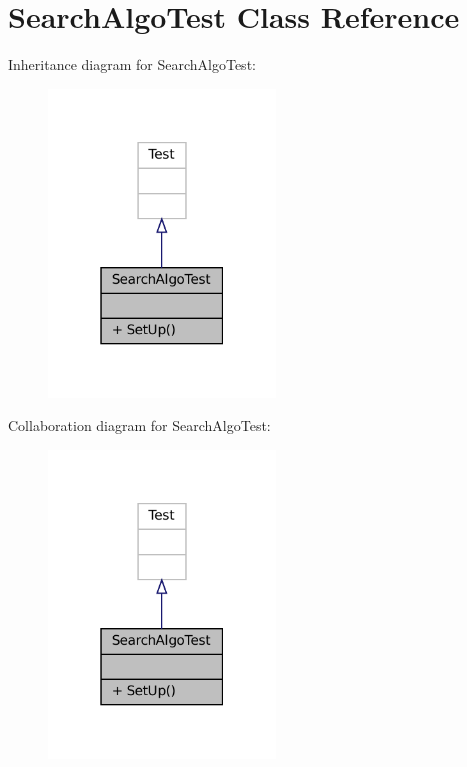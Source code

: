 \hypertarget{classSearchAlgoTest}{}\section{Search\+Algo\+Test Class Reference}
\label{classSearchAlgoTest}


Inheritance diagram for Search\+Algo\+Test\+:\nopagebreak
\begin{figure}[H]
\begin{center}
\leavevmode
\includegraphics[width=171pt]{classSearchAlgoTest__inherit__graph}
\end{center}
\end{figure}


Collaboration diagram for Search\+Algo\+Test\+:\nopagebreak
\begin{figure}[H]
\begin{center}
\leavevmode
\includegraphics[width=171pt]{classSearchAlgoTest__coll__graph}
\end{center}
\end{figure}
